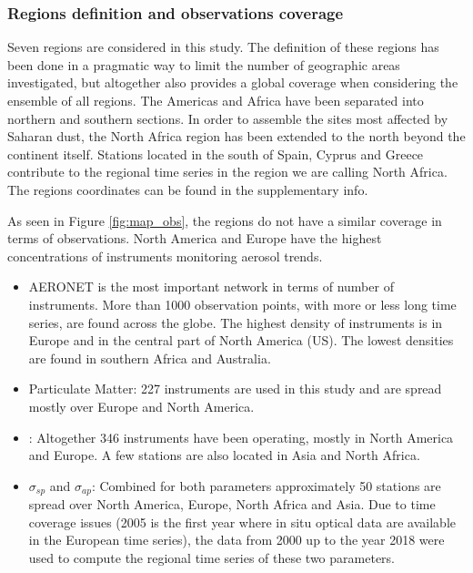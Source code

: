 \documentclass[acp, manuscript]{copernicus}
\begin{document}
\subsubsection{Regions definition and observations coverage}
Seven regions are considered in this study. The definition of these regions has been done in a pragmatic way to limit the number of geographic areas investigated, but altogether also provides a global coverage when considering the ensemble of all regions. The Americas and Africa have been separated into northern and southern sections. In order to assemble the sites most affected by Saharan dust, the North Africa region has been extended to the north beyond the continent itself. Stations located in the south of Spain, Cyprus and Greece contribute to the regional time series in the region we are calling North Africa. The regions coordinates can be found in the supplementary info.

As seen in Figure \ref{fig:map_obs}, the regions do not have a similar coverage in terms of observations. North America and Europe have the highest concentrations of instruments monitoring aerosol trends.
\begin{itemize}
 \item AERONET is the most important network in terms of number of instruments. More than 1000 observation points, with more or less long time series, are found across the globe. The highest density of instruments is in Europe and in the central part of North America (US). The lowest densities are found in southern Africa and Australia.
 \item Particulate Matter: 227 instruments are used in this study and are spread mostly over Europe and North America.
 \item {}: Altogether 346 instruments have been operating, mostly in North America and Europe. A few stations are also located in Asia and North Africa.
 \item $\sigma_{sp}$ and $\sigma_{ap}$: Combined for both parameters approximately 50 stations are spread over North America, Europe, North Africa and Asia. Due to time coverage issues (2005 is the first year where in situ optical data are available in the European time series), the data from 2000 up to the year 2018 were used to compute the regional time series of these two parameters.
\end{itemize}
\end{document}
